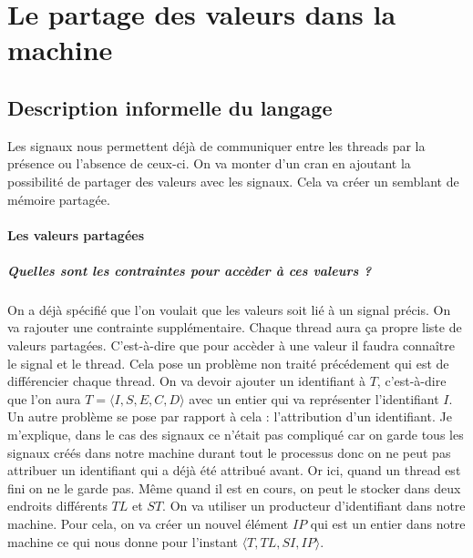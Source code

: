\documentclass[10pt,a4paper]{report}
\begin{document}
\section{Le partage des valeurs dans la machine}

\subsection{Description informelle du langage}
Les signaux nous permettent déjà de communiquer entre les threads par la présence ou l'absence de ceux-ci. On va monter d'un cran en ajoutant la possibilité de partager des valeurs avec les signaux. Cela va créer un semblant de mémoire partagée.
\medbreak

\paragraph{Les valeurs partagées}

\subparagraph{Quelles sont les contraintes pour accèder à ces valeurs ?}
On a déjà spécifié que l'on voulait que les valeurs soit lié à un signal précis. On va rajouter une contrainte supplémentaire. Chaque thread aura ça propre liste de valeurs partagées. C'est-à-dire que pour accèder à une valeur il faudra connaître le signal et le thread. Cela pose un problème non traité précédement qui est de différencier chaque thread. On va devoir ajouter un identifiant à $T$, c'est-à-dire que l'on aura $T = \langle I,S,E,C,D\rangle$ avec un entier qui va représenter l'identifiant $I$. Un autre problème se pose par rapport à cela : l'attribution d'un identifiant.
\smallbreak
Je m'explique, dans le cas des signaux ce n'était pas compliqué car on garde tous les signaux créés dans notre machine durant tout le processus donc on ne peut pas attribuer un identifiant qui a déjà été attribué avant. Or ici, quand un thread est fini on ne le garde pas. Même quand il est en cours, on peut le stocker dans deux endroits différents $TL$ et $ST$. On va utiliser un producteur d'identifiant dans notre machine. Pour cela, on va créer un nouvel élément $IP$ qui est un entier dans notre machine ce qui nous donne pour l'instant $\langle T,TL,SI,IP\rangle$.
\medbreak
\end{document}
